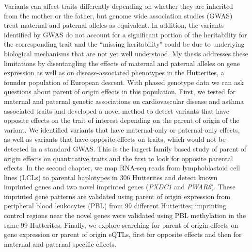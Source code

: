 \abstract

Variants can affect traits differently depending on whether they are inherited from the mother or the father, but genome wide association studies (GWAS) treat maternal and paternal alleles as equivalent. In addition, the variants identified by GWAS do not account for a significant portion of the heritability for the corresponding trait and the ``missing heritability" could be due to underlying biological mechanisms that are not yet well understood. My thesis addresses these limitations by disentangling the effects of maternal and paternal alleles on gene expression as well as on disease-associated phenotypes in the Hutterites, a founder population of European descent. With phased genotype data we can ask questions about parent of origin effects in this population. First, we tested for maternal and paternal genetic associations on cardiovascular disease and asthma associated traits and developed a novel method to detect variants that have opposite effects on the trait of interest depending on the parent of origin of the variant. We identified variants that have maternal-only or paternal-only effects, as well as variants that have opposite effects on traits, which would not be detected in a standard GWAS. This is the largest family based study of parent of origin effects on quantitative traits and the first to look for opposite parental effects. In the second chapter, we map RNA-seq reads from lymphoblastoid cell lines (LCLs) to parental haplotypes in 306  Hutterites and detect known imprinted genes and two novel imprinted genes (\emph{PXDC1} and \emph{PWAR6}). These imprinted gene patterns are validated using parent of origin expression from peripheral blood leukocytes (PBL)  from 99 different Hutterites; imprinting control regions near the novel genes were validated using PBL methylation in the same 99 Hutterites. Finally, we explore searching for parent of origin effects on gene expression or parent of origin eQTLs, first for opposite effects and then for maternal and paternal specific effects. 
